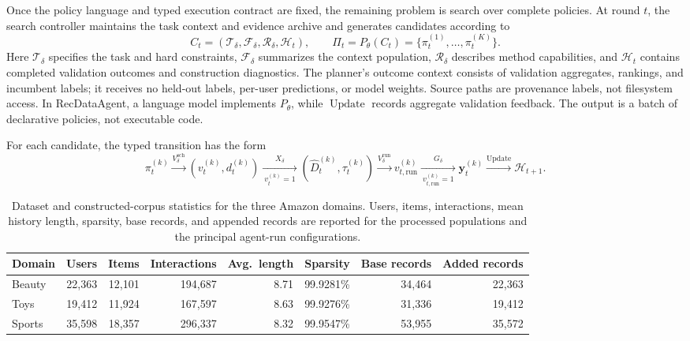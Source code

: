 Once the policy language and typed execution contract are fixed, the remaining problem is search over complete policies. At round $t$, the search controller maintains the task context and evidence archive and generates candidates according to
\begin{equation}
 C_t=\left(\mathcal{T}_{\delta},\mathcal{F}_{\delta},
 \mathcal{R}_{\delta},\mathcal{H}_t\right),
 \qquad
 \Pi_t=P_{\theta}(C_t)
 =\{\pi_t^{(1)},\ldots,\pi_t^{(K)}\}.
 \label{eq:agent_context}
\end{equation}
Here $\mathcal{T}_{\delta}$ specifies the task and hard constraints, $\mathcal{F}_{\delta}$ summarizes the context population, $\mathcal{R}_{\delta}$ describes method capabilities, and $\mathcal{H}_t$ contains completed validation outcomes and construction diagnostics.
The planner's outcome context consists of validation aggregates, rankings, and incumbent labels; it receives no held-out labels, per-user predictions, or model weights. Source paths are provenance labels, not filesystem access.
In RecDataAgent, a language model implements $P_{\theta}$, while $\operatorname{Update}$ records aggregate validation feedback.
The output is a batch of declarative policies, not executable code.

For each candidate, the typed transition has the form
\begin{equation}
 \pi_t^{(k)}
 \xrightarrow{V_{\delta}^{\mathrm{sch}}}
 (v_t^{(k)},d_t^{(k)})
 \xrightarrow[\ v_t^{(k)}=1\ ]{X_{\delta}}
 (\widehat D_t^{(k)},\tau_t^{(k)})
 \xrightarrow{V_{\delta}^{\mathrm{run}}}
 v_{t,\mathrm{run}}^{(k)}
 \xrightarrow[\ v_{t,\mathrm{run}}^{(k)}=1\ ]{G_{\delta}}
  \mathbf{y}_t^{(k)}
  \xrightarrow{\operatorname{Update}}
 \mathcal{H}_{t+1}.
\label{eq:agent_transition}
\end{equation}

\begin{table}[!t]
\centering
\caption{Dataset and constructed-corpus statistics for the three Amazon domains. Users, items, interactions, mean history length, sparsity, base records, and appended records are reported for the processed populations and the principal agent-run configurations.}
\label{tab:data-stats}
\small
\setlength{\tabcolsep}{5.5pt}
\begin{tabular}{lrrrrrrr}
\toprule
Domain & Users & Items & Interactions & Avg.\ length & Sparsity & Base records & Added records \\
\midrule
Beauty & 22,363 & 12,101 & 194,687 & 8.71 & 99.9281\% & 34,464 & 22,363 \\
Toys   & 19,412 & 11,924 & 167,597 & 8.63 & 99.9276\% & 31,336 & 19,412 \\
Sports & 35,598 & 18,357 & 296,337 & 8.32 & 99.9547\% & 53,955 & 35,572 \\
\bottomrule
\end{tabular}
\end{table}

